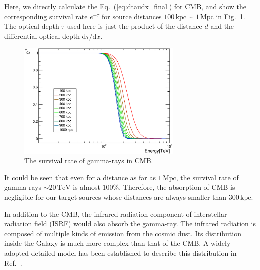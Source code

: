 \documentclass[12pt,aps,prd,amsmath,amssymb,showpacs,floats,floatfix,nofootinbib]{revtex4-1}
\def\TeV{\mathrm{TeV}} %
\def\kpc{\mathrm{kpc}} %
\def\Mpc{\mathrm{Mpc}} %
\begin{document}
Here, we directly calculate the Eq.~(\ref{eq:dtaudx_final}) for CMB, and show the corresponding survival rate $e^{-\tau}$ for source distances $100\,\kpc\sim1\,\Mpc$ in Fig.~\ref{fig:opacity}.
The optical depth $\tau$ used here is just the product of the distance $d$ and the differential optical depth $\mathrm{d}\tau/\mathrm{d}x$.
\begin{figure}[!htpb]
  \centering
  \includegraphics[width=0.7\textwidth]{opacity.eps}
  \caption{The survival rate of gamma-rays in CMB.}
  \label{fig:opacity}
\end{figure}
It could be seen that even for a distance as far as $1\,\Mpc$, the survival rate of gamma-rays $\sim20\,\TeV$ is almost $100\%$.
Therefore, the absorption of CMB is negligible for our target sources whose distances are always smaller than $300\,\kpc$.
%  

In addition to the CMB, the infrared radiation component of interstellar radiation field (ISRF) would also absorb the gamma-ray.
The infrared radiation is composed of multiple kinds of emission from the cosmic dust.
Its distribution inside the Galaxy is much more complex than that of the CMB.
A widely adopted detailed model has been established to describe this distribution in Ref.~\cite{Strong:1998fr}.
\end{document}
